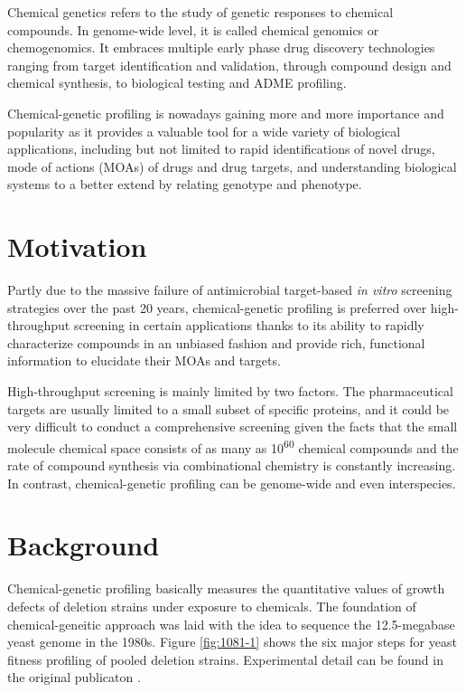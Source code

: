 \documentclass[12pt,conference,compsocconf]{../IEEEtran}
\begin{document}
Chemical genetics refers to the study of genetic responses to chemical compounds. In genome-wide level, it is called chemical genomics or chemogenomics. It embraces multiple early phase drug discovery technologies ranging from target identification and validation, through compound design and chemical synthesis, to biological testing and ADME profiling.

Chemical-genetic profiling is nowadays gaining more and more importance and popularity as it provides a valuable tool for a wide variety of biological applications, including but not limited to rapid identifications of novel drugs, mode of actions (MOAs) of drugs and drug targets, and understanding biological systems to a better extend by relating genotype and phenotype.

\section{Motivation}

Partly due to the massive failure of antimicrobial target-based \textit{in vitro} screening strategies over the past 20 years, chemical-genetic profiling is preferred over high-throughput screening in certain applications thanks to its ability to rapidly characterize compounds in an unbiased fashion and provide rich, functional information to elucidate their MOAs and targets.

High-throughput screening is mainly limited by two factors. The pharmaceutical targets are usually limited to a small subset of specific proteins, and it could be very difficult to conduct a comprehensive screening given the facts that the small molecule chemical space consists of as many as 10\textsuperscript{60} chemical compounds \citep{1104} and the rate of compound synthesis via combinational chemistry is constantly increasing. In contrast, chemical-genetic profiling can be genome-wide and even interspecies.

\section{Background}

Chemical-genetic profiling basically measures the quantitative values of growth defects of deletion strains under exposure to chemicals. The foundation of chemical-geneitic approach was laid with the idea to sequence the 12.5-megabase yeast genome in the 1980s. Figure \ref{fig:1081-1} shows the six major steps for yeast fitness profiling of pooled deletion strains. Experimental detail can be found in the original publicaton \citep{1081}.
\end{document}
